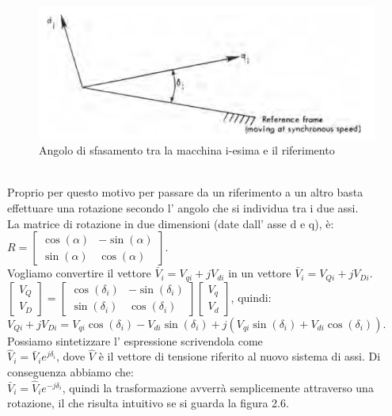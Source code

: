 \documentclass[Lau,noexaminfo]{sapthesis}
\begin{document}
	\begin{figure}
		\centering
		\includegraphics[height=0.2\textheight]{riferimento_comune}
		\caption{Angolo di sfasamento tra la macchina i-esima e il riferimento}
	\end{figure}\\
	Proprio per questo motivo per passare da un riferimento a un altro basta effettuare una rotazione secondo l' angolo che si individua tra i due assi.
	\\
	La matrice di rotazione in due dimensioni (date dall' asse d e q), è:\\
	$R=\begin{bmatrix}
	\cos(\alpha) & -\sin(\alpha)\\
	\sin(\alpha) & \cos(\alpha)
	\end{bmatrix}$. \\
	Vogliamo convertire il vettore $\bar{V}_{i}=V_{qi}+jV_{di}$ in un vettore $\bar{V}_{i}=V_{Qi}+jV_{Di}$.\\
	$\begin{bmatrix}
	V_Q\\
	V_D
	\end{bmatrix}=
	\begin{bmatrix}
	\cos(\delta_i) & -\sin(\delta_i)\\
	\sin(\delta_i) & \cos(\delta_i)
	\end{bmatrix}
	\begin{bmatrix}
	V_q\\
	V_d
	\end{bmatrix}$, quindi:\\
	$V_{Qi}+jV_{Di}=V_{qi}\cos(\delta_i)-V_{di}\sin(\delta_i) +j(V_{qi}\sin(\delta_i)+V_{di}\cos(\delta_i))$.\\
	Possiamo sintetizzare l' espressione scrivendola come\\
	$\hat{V}_i=\bar{V}_ie^{j\delta_i}$, dove $\hat{V}$ è il vettore di tensione riferito al nuovo sistema di assi. Di conseguenza abbiamo che:\\
	$\bar{V}_i=\hat{V}_ie^{-j\delta_i}$, quindi la trasformazione avverrà semplicemente attraverso una rotazione, il che risulta intuitivo se si guarda la figura 2.6.
\end{document}
